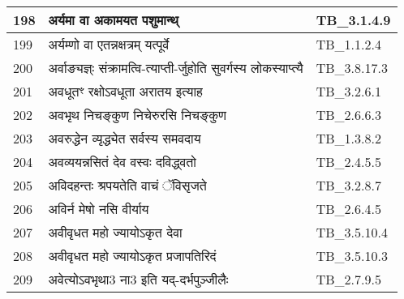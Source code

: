 \documentclass[17pt]{extarticle}
\begin{document}
\begin{longtable}{||p{0.4in}||p{4.9in}||p{0.9in}||}
    \hline
        
    198 & अर्यमा वा अकामयत पशुमान्थ् & TB\_3.1.4.9       \\
    
    \hline
        
    199 & अर्यम्णो वा एतन्नक्षत्रम् यत्पूर्वे & TB\_1.1.2.4       \\
    
    \hline
        
    200 & अर्वाङ्यज्ञ्ः संक्रामत्वि{-}त्याप्ती{-}र्जुहोति सुवर्गस्य लोकस्याप्त्यै & TB\_3.8.17.3       \\
    
    \hline
        
    201 & अवधूतꣳ रक्षोऽवधूता अरातय इत्याह & TB\_3.2.6.1       \\
    
    \hline
        
    202 & अवभृथ निचङ्कुण निचेरुरसि निचङ्कुण & TB\_2.6.6.3       \\
    
    \hline
        
    203 & अवरुद्धेन व्यृद्ध्येत सर्वस्य समवदाय & TB\_1.3.8.2       \\
    
    \hline
        
    204 & अवव्ययन्नसितं देव वस्वः दविद्ध्वतो & TB\_2.4.5.5       \\
    
    \hline
        
    205 & अविदहन्तः श्रपयतेति वाचं ॅविसृजते & TB\_3.2.8.7       \\
    
    \hline
        
    206 & अविर्न मेषो नसि वीर्याय & TB\_2.6.4.5       \\
    
    \hline
        
    207 & अवीवृधत महो ज्यायोऽकृत देवा & TB\_3.5.10.4       \\
    
    \hline
        
    208 & अवीवृधत महो ज्यायोऽकृत प्रजापतिरिदं & TB\_3.5.10.3       \\
    
    \hline
        
    209 & अवेत्योऽवभृथा3 ना3 इति यद्{-}दर्भपुञ्जीलैः & TB\_2.7.9.5       \\
    
    \hline
        

\end{longtable}
\end{document}
